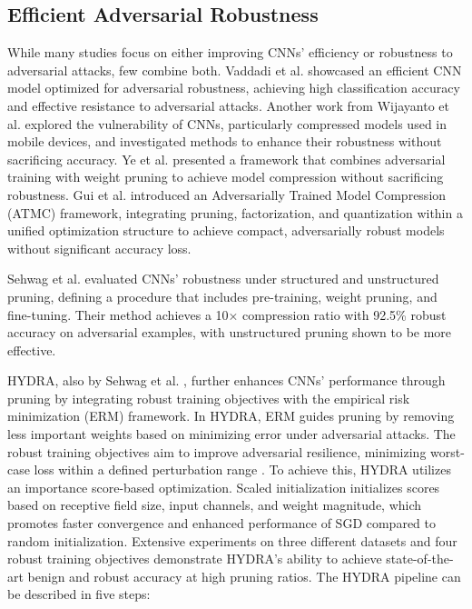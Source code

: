 \documentclass[10pt]{cai}
\begin{document}
\subsection{Efficient Adversarial Robustness}
While many studies focus on either improving CNNs' efficiency or robustness to adversarial attacks, few combine both. Vaddadi et al. \cite{EAR1} showcased an efficient CNN model optimized for adversarial robustness, achieving high classification accuracy and effective resistance to adversarial attacks. Another work from Wijayanto et al. \cite{EAR2} explored the vulnerability of CNNs, particularly compressed models used in mobile devices, and investigated methods to enhance their robustness without sacrificing accuracy. Ye et al. \cite{EAR3} presented a framework that combines adversarial training with weight pruning to achieve model compression without sacrificing robustness. Gui et al. \cite{EAR4} introduced an Adversarially Trained Model Compression (ATMC) framework, integrating pruning, factorization, and quantization within a unified optimization structure to achieve compact, adversarially robust models without significant accuracy loss. 

Sehwag et al. \cite{beforehydra} evaluated CNNs' robustness under structured and unstructured pruning, defining a procedure that includes pre-training, weight pruning, and fine-tuning. Their method achieves a 10× compression ratio with 92.5\% robust accuracy on adversarial examples, with unstructured pruning shown to be more effective.

HYDRA, also by Sehwag et al. \cite{hydra}, further enhances CNNs' performance through pruning by integrating robust training objectives with the empirical risk minimization (ERM) framework. In HYDRA, ERM guides pruning by removing less important weights based on minimizing error under adversarial attacks. The robust training objectives aim to improve adversarial resilience, minimizing worst-case loss within a defined perturbation range \cite{mixtrain}. To achieve this, HYDRA utilizes an importance score-based optimization. Scaled initialization initializes scores based on receptive field size, input channels, and weight magnitude, which promotes faster convergence and enhanced performance of SGD compared to random initialization. Extensive experiments on three different datasets and four robust training objectives demonstrate HYDRA's ability to achieve state-of-the-art benign and robust accuracy at high pruning ratios. The HYDRA pipeline can be described in five steps:
\end{document}
